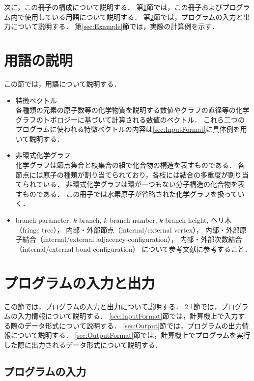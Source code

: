 \documentclass[11pt,titlepage,dvipdfmx,twoside]{jarticle}
\begin{document}
次に，この冊子の構成について説明する．
第\ref{sec:term}節では，この冊子およびプログラム内で使用している用語について説明する．
第\ref{sec:InOut}節では，プログラムの入力と出力について説明する．
第\ref{sec:Example}節では，実際の計算例を示す．


\newpage

\section{用語の説明}
\label{sec:term}

この節では，用語について説明する．
\begin{itemize}
\item 特徴ベクトル\\
各種類の元素の原子数等の化学物質を説明する数値やグラフの直径等の化学グラフのトポロジーに基づいて計算される数値のベクトル．
これら二つのプログラムに使われる特徴ベクトルの内容は\ref{sec:InputFormat}に具体例を用いて説明する．

\item 非環式化学グラフ\\
化学グラフは節点集合と枝集合の組で化合物の構造を表すものである．
各節点には原子の種類が割り当てられており，各枝には結合の多重度が割り当てられている．
非環式化学グラフは環が一つもない分子構造の化合物を表すものである．
この冊子では水素原子が省略された化学グラフを扱っていく．

\item branch-parameter, $k$-branch, $k$-branch-number, $k$-branch-height, 
ヘリ木（fringe tree），
内部・外部節点（internal/external vertex），
内部・外部原子結合（internal/external adjacency-configuration），
内部・外部次数結合（internal/external bond-configuration）
について参考文献\cite{branch}に参考すること．

\end{itemize}

\section{プログラムの入力と出力}
\label{sec:InOut}

この節では，プログラムの入力と出力について説明する．
\ref{sec:Input}節では，プログラムの入力情報について説明する．
\ref{sec:InputFormat}節では，計算機上で入力する際のデータ形式について説明する．
\ref{sec:Output}節では，プログラムの出力情報について説明する．
\ref{sec:OutputFormat}節では，計算機上でプログラムを実行した際に出力されるデータ形式について説明する．

\subsection{プログラムの入力}
\label{sec:Input}
\end{document}
